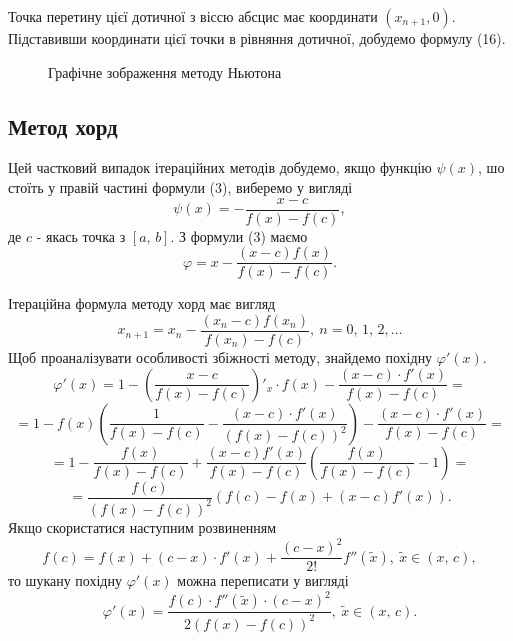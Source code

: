 \documentclass[14pt,a4paper,titlepage]{extarticle}
\begin{document}
Точка перетину цієї дотичної з віссю абсцис має координати $(x_{n+1}, 0)$. Підставивши координати цієї точки в рівняння дотичної, добудемо формулу (16).
\begin{figure}[h]
\caption{Графічне зображення методу Ньютона}
\end{figure}

{\centering \subsection{Метод хорд}}

Цей частковий випадок ітераційних методів добудемо, якщо функцію $\psi(x)$, шо стоїть у правій частині формули (3), виберемо у вигляді 
$$
\psi(x) = - \frac{x - c}{f(x) - f(c)},
$$
де $c$ - якась точка з $[a,\,b]$. З формули (3) маємо
$$
\varphi = x - \frac{(x - c)f(x)}{f(x) - f(c)}.
$$

Ітераційна формула методу хорд має вигляд
\begin{equation}
x_{n+1} = x_n - \frac{(x_n - c)f(x_n)}{f(x_n) - f(c)},\ n = 0,\,1,\,2,\ldots
\end{equation}
Щоб проаналізувати особливості збіжності методу, знайдемо похідну $\varphi'(x)$.
$$
\varphi'(x) = 1 - \left(\frac{x - c}{f(x) - f(c)}\right)'_x \cdot f(x) - \frac{(x - c) \cdot f'(x)}{f(x) - f(c)} =$$$$
= 1 - f(x)\left(\frac{1}{f(x) - f(c)} - \frac{(x - c) \cdot f'(x)}{(f(x) - f(c))^2}\right) - \frac{(x - c)\cdot f'(x)}{f(x) - f(c)} = $$$$
= 1 - \frac{f(x)}{f(x) - f(c)} + \frac{(x - c)f'(x)}{f(x) - f(c)}\left( \frac{f(x)}{f(x) - f(c)} - 1 \right) = $$$$
= \frac{f(c)}{(f(x) - f(c))^2}(f(c)-f(x)+(x-c)f'(x)).$$
Якщо скористатися наступним розвиненням
$$
f(c) = f(x) + (c - x)\cdot f'(x) + \frac{(c - x)^2}{2!}f''(\widetilde{ x}),\  \widetilde{x}\in (x,\,c),
$$
то шукану похідну $\varphi'(x)$ можна переписати у вигляді
\begin{equation}
\varphi'(x) = \frac{f(c)\cdot f''(\widetilde{x}) \cdot (c - x)^2}{2(f(x) - f(c))^2},\ \widetilde{x}\in (x,\,c).
\end{equation}
\end{document}
